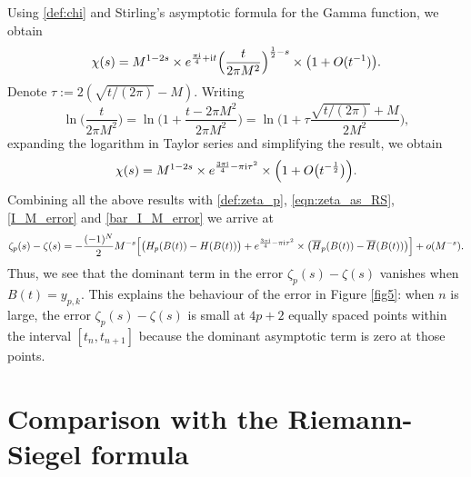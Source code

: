 \documentclass[12pt]{article}
\def\i{{\textnormal i}}
\theoremstyle{definition}
\begin{document}
Using \eqref{def:chi} and Stirling's asymptotic formula for the Gamma function, we obtain  
$$
\chi(s)=M^{1-2s} \times e^{\frac{\pi \i}{4} + \i t} \Big(\frac{t}{2\pi M^2}\Big)^{\frac{1}{2}-s} \times 
\big(1+O(t^{-1})\big). 
$$
Denote $\tau:=2(\sqrt{t/(2\pi)}-M)$. Writing 
$$
\ln\Big(\frac{t}{2\pi M^2}\Big)=\ln\Big(1+\frac{t-2\pi M^2}{2\pi M^2}\Big)=  \ln\Big(1+\tau \frac{\sqrt{t/(2\pi)}+ M}{2 M^2}\Big), 
$$
expanding the logarithm in Taylor series and simplifying the result, we obtain 
$$
 \chi(s)=M^{1-2s} \times e^{\frac{3 \pi \i}{4}- \pi \i \tau^2}\times \Big(1+
O\big(t^{-\frac{1}{2}}\big)\Big).
$$ 
Combining all the above results with \eqref{def:zeta_p}, 
\eqref{eqn:zeta_as_RS}, \eqref{I_M_error} and  \eqref{bar_I_M_error} we arrive at 
\begin{equation}\label{zeta_p_asymptotic_error}
\zeta_p(s)-\zeta(s)=-\frac{(-1)^N}{2} M^{-s} \Big[ 
 \big( H_p(B(t))-H(B(t)) \big) 
+ e^{\frac{3 \pi \i}{4}- \pi \i \tau^2} \times \big( \overline H_p(B(t))-\overline H(B(t)) \big)\Big]+ o(M^{-s}).
\end{equation}
Thus, we see that the dominant term in the error $\zeta_p(s)-\zeta(s)$ vanishes when $B(t)=y_{p,k}$. This explains the behaviour of the error in Figure \ref{fig5}: when $n$ is large, the error $\zeta_p(s)-\zeta(s)$ is small at $4p+2$ equally spaced points within the interval $[t_n, t_{n+1}]$ because the dominant asymptotic term is zero at those points. 

\section{Comparison with the Riemann-Siegel formula}\label{Section_compare_with_RS}
\end{document}
